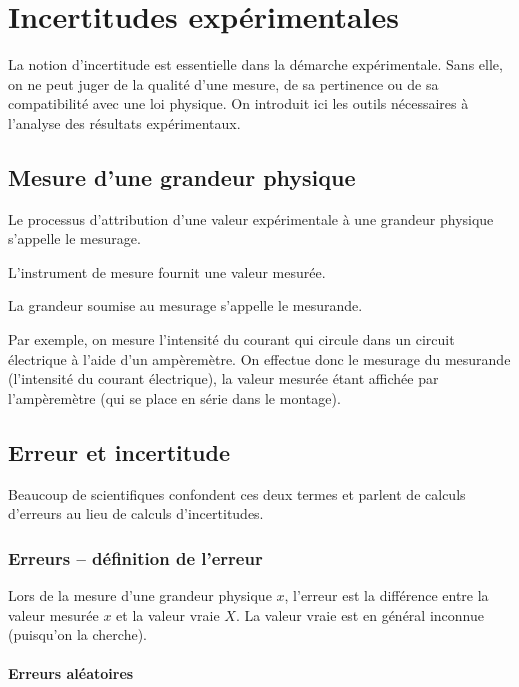 \chapter{Incertitudes expérimentales}

\minitoc

La notion d'incertitude est essentielle dans la démarche expérimentale. Sans elle, on ne peut juger de la qualité d'une mesure, de sa pertinence ou de sa compatibilité avec une loi physique. On introduit ici les outils nécessaires à l'analyse des résultats expérimentaux.

\section{Mesure d'une grandeur physique}

Le processus d'attribution d'une valeur expérimentale à une grandeur physique s'appelle le mesurage.

L'instrument de mesure fournit une valeur mesurée.

La grandeur soumise au mesurage s'appelle le mesurande.

Par exemple, on mesure l'intensité du courant qui circule dans un circuit électrique à l'aide d'un ampèremètre. On effectue donc le mesurage du mesurande (l'intensité du courant électrique), la valeur mesurée étant affichée par l'ampèremètre (qui se place en série dans le montage).

\section{Erreur et incertitude}

Beaucoup de scientifiques confondent ces deux termes et parlent de calculs d'erreurs au lieu de calculs d'incertitudes.

\subsection{Erreurs -- définition de l'erreur}

Lors de la mesure d'une grandeur physique \(x\), l'erreur est la différence entre la valeur mesurée \(x\) et la valeur vraie \(X\). La valeur vraie est en général inconnue (puisqu'on la cherche).

\subsubsection{Erreurs aléatoires}

